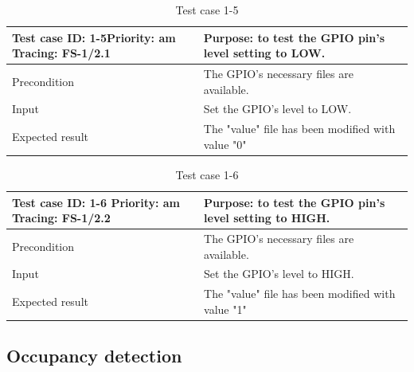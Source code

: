 \begin{table}[H]
	\caption{Test case 1-5}
	\label{table:TCase-FS1-5}
	\begin{center}
		\renewcommand{\arraystretch}{1.8}
		\begin{tabu} 
			to 0.9 \textwidth
			{  X[0.4, c] X[c] }
			\toprule
			Test case ID: 1-5\newline Priority: am \newline Tracing: FS-1/2.1 & Purpose: to test the GPIO pin's level setting to LOW. \\ \midrule
			Precondition                                                      & The GPIO's necessary files are available.            \\
			Input                                                             & Set the GPIO's level to LOW.                         \\
			Expected result                                                   & The "value" file has been modified with value "0"    \\ \bottomrule
		\end{tabu}
	\end{center}
\end{table} 

\begin{table}[H]
	\caption{Test case 1-6}
	\label{table:TCase-FS1-6}
	\begin{center}
		\renewcommand{\arraystretch}{1.8}
		\begin{tabu} 
			to 0.9 \textwidth
			{  X[0.4, c] X[c] }
			\toprule
			Test case ID: 1-6 \newline Priority: am \newline Tracing: FS-1/2.2 & Purpose: to test the GPIO pin's level setting to HIGH. \\ \midrule
			Precondition                                                       & The GPIO's necessary files are available.              \\
			Input                                                              & Set the GPIO's level to HIGH.                         \\
			Expected result                                                    & The "value" file has been modified with value "1"     \\ \bottomrule
		\end{tabu}
	\end{center}
\end{table} 

\subsection{Occupancy detection}

